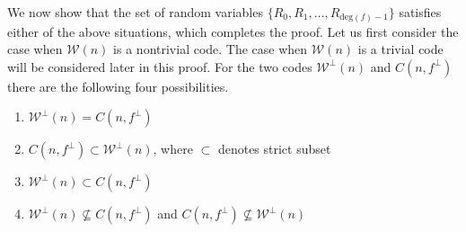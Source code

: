 \documentclass[10pt,journal]{IEEEtran}
\def \deg{{\mathrm{deg}}}
\def \Fig {Fig.}
\begin{document}
\begin{IEEEproof}
We now show that the set of random variables $\{ R_0, R_1, \ldots, R_{\deg(f)-1} \}$
satisfies either of the above situations, which completes the proof.
Let us first consider the case when $\mathcal{W}(n)$ is a nontrivial code. 
The case when $\mathcal{W}(n)$ is a trivial code will be considered later in this proof.
For the two codes $\mathcal{W}^{\perp}(n)$ and $C(n,f^{\perp})$ there are the
following four possibilities.
% 
\begin{enumerate}[1)]
%  
\item $\mathcal{W}^{\perp}(n) = C(n,f^{\perp})$ 
\item $C(n,f^{\perp}) \subset \mathcal{W}^{\perp}(n)$, where $\subset$ denotes strict subset
\item $\mathcal{W}^{\perp}(n) \subset C(n,f^{\perp})$
\item $\mathcal{W}^{\perp}(n) \nsubseteq C(n,f^{\perp})$ and $C(n,f^{\perp}) \nsubseteq \mathcal{W}^{\perp}(n)$
% 
\end{enumerate}
% 
% 
%  
% 
% 
% 
% 
% 
% 
% 

\end{IEEEproof}
\end{document}
